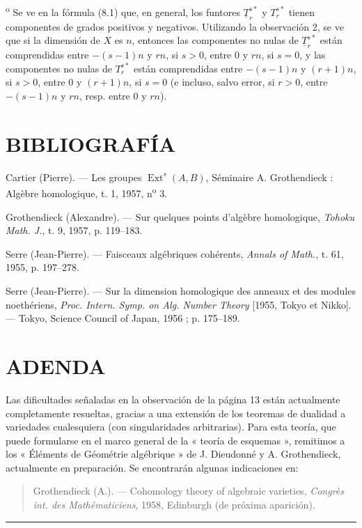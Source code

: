 \medskip
{}\textsuperscript{o} Se ve en la fórmula (8.1) que, en general, los
funtores $\underline{T}_{r}^{s*}$ y $T_{r}^{s*}$ tienen componentes de
grados positivos y negativos. Utilizando la observación 2, se ve que si la
dimensión de $X$ es $n$, entonces las componentes no nulas de
$\underline{T}_{r}^{s*}$ están comprendidas entre $-(s-1)n$ y $rn$, si $s>0$,
entre $0$ y $rn$, si $s=0$, y las componentes no nulas de $T_{r}^{s*}$
están comprendidas entre $-(s-1)n$ y $(r+1)n$, si $s>0$, entre $0$ y $(r+1)n$,
si $s=0$ (e incluso, salvo error, si $r>0$, entre $-(s-1)n$ y $rn$, resp. entre
$0$ y $rn$).

\section*{BIBLIOGRAFÍA}

\noindent[1] Cartier (Pierre). --- Les groupes
$\operatorname{Ext}^{s}(A,B)$, Séminaire A. Grothendieck : Algèbre homologique,
t. 1, 1957, n\textsuperscript{o} 3.

\noindent[2] Grothendieck (Alexandre). --- Sur quelques points d'algèbre
homologique, \emph{Tohoku Math. J.}, t. 9, 1957, p. 119--183.

\noindent[3] Serre (Jean-Pierre). --- Faisceaux algébriques cohérents,
\emph{Annals of Math.}, t. 61, 1955, p. 197--278.

\noindent[4] Serre (Jean-Pierre). --- Sur la dimension homologique des anneaux
et des modules noethériens, \emph{Proc. Intern. Symp. on Alg. Number Theory}
[1955, Tokyo et Nikko]. --- Tokyo, Science Council of Japan, 1956 ;
p. 175--189.

\clearpage
{}
\section*{ADENDA}

Las dificultades señaladas en la observación de la página 13 están actualmente
completamente resueltas, gracias a una extensión de los teoremas de dualidad a
variedades cualesquiera (con singularidades arbitrarias). Para esta teoría, que puede
formularse en el marco general de la « teoría de esquemas », remitimos
a los « Éléments de Géométrie algébrique » de J. Dieudonné y A. Grothendieck,
actualmente en preparación. Se encontrarán algunas indicaciones en:

\begin{quote}
Grothendieck (A.). --- Cohomology theory of algebraic varieties,
\emph{Congrès int. des Mathématiciens}, 1958, Edinburgh (de próxima aparición).
\end{quote}

\begin{flushright}
[Abril de 1959]
\end{flushright}

\begin{center}\rule{36mm}{0.5pt}\end{center}
